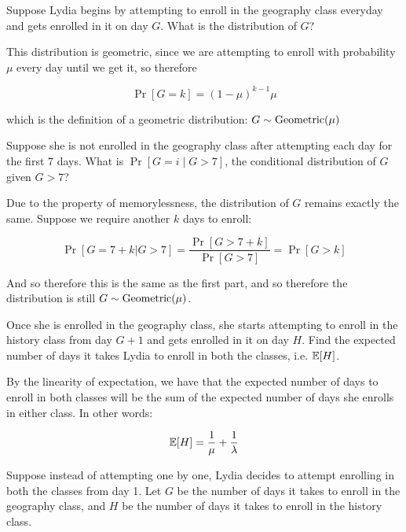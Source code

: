 \documentclass[11pt]{article}
\begin{document}
\begin{Parts}
	\Part Suppose Lydia begins by attempting to enroll in the geography class everyday and gets enrolled in it on day $G$. 
	What is the distribution of $G$?

	\begin{solution}
		This distribution is geometric, since we are attempting to enroll with probability $\mu$ every day until we get it, so therefore 

		\[ \Pr[G = k] = (1-\mu)^{k-1}\mu\]

		which is the definition of a geometric distribution: $G \sim \operatorname{Geometric}(\mu)$
	\end{solution}

	\Part Suppose she is not enrolled in the geography class after attempting each day for the first 7 days. What is $\Pr[G = i \mid G > 7]$, the conditional distribution of $G$ given $G > 7$?

	\begin{solution}
		Due to the property of memorylessness, the distribution of $G$ remains exactly the same. Suppose we require another $k$ days to enroll: 


		\[ \Pr[G = 7 + k | G > 7] = \frac{\Pr[G > 7 + k]}{\Pr[G > 7]} = \Pr[G > k]\]

		And so therefore this is the same as the first part, and so therefore the distribution is still $ G \sim \operatorname{Geometric}(\mu)$.
	\end{solution}

	\Part Once she is enrolled in the geography class, she starts attempting to enroll in the history class from day $G+1$ and gets enrolled in it on day $H$.
	Find the expected number of days it takes Lydia to enroll in both the classes, i.e. $\operatorname{\mathbb{E}}[H]$.

	\begin{solution}
		By the linearity of expectation, we have that the expected number of days to enroll in both classes will be the sum of the expected number of days she enrolls in either class. In other words: 

		\[ \operatorname{\mathbb{E}}[H] = \frac{1}{\mu} + \frac{1}{\lambda}\]
	\end{solution}
	
\end{Parts}
Suppose instead of attempting one by one, Lydia decides to attempt enrolling in both the classes from day 1. Let $G$ be the number of days it takes to enroll in the geography class, and $H$ be the number of days it takes to enroll in the history class.
\end{document}
